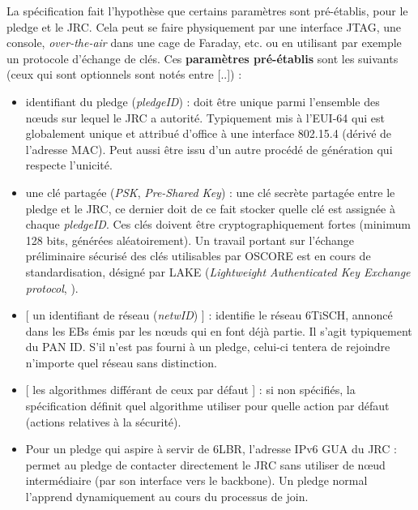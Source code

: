 \documentclass[]{report}
\begin{document}
La spécification \cite{ietf-6tisch-minimal-security-15} fait l'hypothèse que certains paramètres sont pré-établis, pour le pledge et le JRC. Cela peut se faire physiquement par une interface JTAG, une console, \textit{over-the-air} dans une cage de Faraday, etc. ou en utilisant par exemple un protocole d'échange de clés. Ces \textbf{paramètres pré-établis} sont les suivants (ceux qui sont optionnels sont notés entre [..]) :
\vspace{0.2cm}
\begin{itemize}[label=$\bullet$]
\item identifiant du pledge (\textit{pledgeID}) : doit être unique parmi l'ensemble des nœuds sur lequel le JRC a autorité. Typiquement mis à l'EUI-64 qui est globalement unique et attribué d'office à une interface 802.15.4 (dérivé de l'adresse MAC). Peut aussi être issu d'un autre procédé de génération qui respecte l'unicité.
\vspace{0.2cm}
\item une clé partagée (\textit{PSK}, \textit{Pre-Shared Key}) : une clé secrète partagée entre le pledge et le JRC, ce dernier doit de ce fait stocker quelle clé est assignée à chaque \textit{pledgeID}. Ces clés doivent être cryptographiquement fortes (minimum 128 bits, générées aléatoirement). Un travail portant sur l'échange préliminaire sécurisé des clés utilisables par OSCORE est en cours de standardisation, désigné par LAKE (\textit{Lightweight Authenticated Key Exchange protocol}, \cite{ietf-lake-reqs-03}).
\vspace{0.2cm}
\item {[} un identifiant de réseau (\textit{netwID}) ] : identifie le réseau 6TiSCH, annoncé dans les EBs émis par les nœuds qui en font déjà partie. Il s'agit typiquement du PAN ID. S'il n'est pas fourni à un pledge, celui-ci tentera de rejoindre n'importe quel réseau sans distinction.
\vspace{0.2cm}
\item {[} les algorithmes différant de ceux par défaut ] : si non spécifiés, la spécification \cite{ietf-6tisch-minimal-security-15} définit quel algorithme  utiliser pour quelle action par défaut (actions relatives à la sécurité).
\vspace{0.2cm}
\item Pour un pledge qui aspire à servir de 6LBR, l'adresse IPv6 GUA du JRC : permet au pledge de contacter directement le JRC sans utiliser de nœud intermédiaire (par son interface vers le backbone). Un pledge normal l'apprend dynamiquement au cours du processus de join.
\end{itemize}
\end{document}
